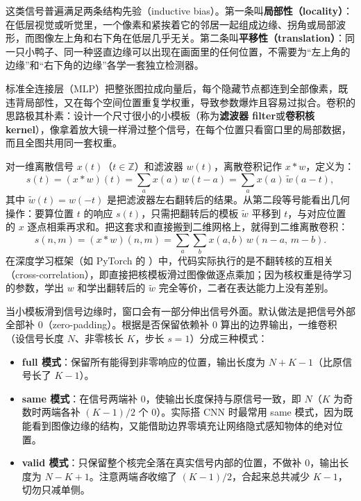 这类信号普遍满足两条结构先验（inductive bias）。第一条叫\textbf{局部性（locality）}：在低层视觉或听觉里，一个像素和紧挨着它的邻居一起组成边缘、拐角或局部波形，而图像左上角和右下角在低层几乎无关。第二条叫\textbf{平移性（translation）}：同一只小鸭子、同一种竖直边缘可以出现在画面里的任何位置，不需要为“左上角的边缘”和“右下角的边缘”各学一套独立检测器。

标准全连接层（MLP）把整张图拉成向量后，每个隐藏节点都连到全部像素，既违背局部性，又在每个空间位置重复学权重，导致参数爆炸且容易过拟合。卷积的思路极其朴素：设计一个尺寸很小的小模板（称为\textbf{滤波器 filter}或\textbf{卷积核 kernel}），像拿着放大镜一样滑过整个信号，在每个位置只看窗口里的局部数据，而且全图共用同一套权重。


对一维离散信号 $x(t)$（$t\in\mathbb{Z}$）和滤波器 $w(t)$，离散卷积记作 $x*w$，定义为：
\[
s(t) = (x * w)(t) = \sum_{a} x(a)\,w(t-a) = \sum_{a} x(a)\,\tilde{w}(a-t),
\tag{6.1}
\]
其中 $\tilde{w}(t) = w(-t)$ 是把滤波器左右翻转后的结果。从第二段等号能看出几何操作：要算位置 $t$ 的响应 $s(t)$，只需把翻转后的模板 $\tilde{w}$ 平移到 $t$，与对应位置的 $x$ 逐点相乘再求和。把这套求和直接搬到二维网格上，就得到二维离散卷积：
\[
s(n,m) = (x * w)(n,m) = \sum_{a}\sum_{b} x(a,b)\,w(n-a,\,m-b).
\tag{6.2}
\]
在深度学习框架（如 PyTorch 的 ）中，代码实际执行的是不翻转核的互相关（cross-correlation），即直接把核模板滑过图像做逐点乘加；因为核权重是待学习的参数，学出 $w$ 和学出翻转后的 $\tilde{w}$ 完全等价，二者在表达能力上没有差别。

当小模板滑到信号边缘时，窗口会有一部分伸出信号外面。默认做法是把信号外部全部补 0（zero-padding）。根据是否保留依赖补 0 算出的边界输出，一维卷积（设信号长度 $N$、非零核长 $K$，步长 $s=1$）分成三种模式：
\begin{itemize}
\item \textbf{full 模式}：保留所有能得到非零响应的位置，输出长度为 $N + K - 1$（比原信号长了 $K-1$）。
\item \textbf{same 模式}：在信号两端补 0，使输出长度保持与原信号一致，即 $N$（$K$ 为奇数时两端各补 $(K-1)/2$ 个 0）。实际搭 CNN 时最常用 same 模式，因为既能看到图像边缘的结构，又能借助边界零填充让网络隐式感知物体的绝对位置。
\item \textbf{valid 模式}：只保留整个核完全落在真实信号内部的位置，不做补 0，输出长度为 $N - K + 1$。注意两端\emph{各}收缩了 $(K-1)/2$，合起来总共减少 $K - 1$，切勿只减单侧。
\end{itemize}

